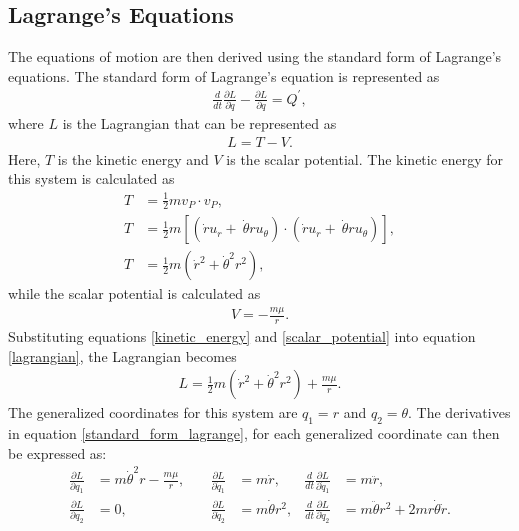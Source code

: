 \documentclass[]{article}
\begin{document}
\subsection{Lagrange's Equations}
The equations of motion are then derived using the standard form of Lagrange's equations. The standard form of Lagrange's equation is represented as
\begin{align}
	\frac{d}{dt}\frac{\partial L}{\partial \dot{q}} - \frac{\partial L}{\partial q} = Q^{'}, \label{standard_form_lagrange}
\end{align}
where \(L\) is the Lagrangian that can be represented as
\begin{align}
	L = T - V. \label{lagrangian}
\end{align}
Here, \(T\) is the kinetic energy and \(V\) is the scalar potential. The kinetic energy for this system is calculated as 
\begin{align}
	T &= \frac{1}{2}mv_{P} \cdot v_{P}, \nonumber\\
	T &= \frac{1}{2}m[(\dot{r}u_{r} +\ \dot{\theta}ru_{\theta}) \cdot (\dot{r}u_{r} +\ \dot{\theta}ru_{\theta})], \nonumber\\
	T &= \frac{1}{2}m(\dot{r}^2+\dot{\theta}^2r^2), \label{kinetic_energy}
\end{align}
while the scalar potential is calculated as
\begin{align}
	V = -\frac{m\mu}{r}. \label{scalar_potential}
\end{align}
Substituting equations \ref{kinetic_energy} and \ref{scalar_potential} into equation \ref{lagrangian}, the Lagrangian becomes
\begin{align}
	L = \frac{1}{2}m(\dot{r}^2+\dot{\theta}^2r^2) + \frac{m\mu}{r}. \label{lagrangian2}
\end{align}
 The generalized coordinates for this system are \(q_1 = r\) and \(q_2 = \theta\). The derivatives in equation \ref{standard_form_lagrange}, for each generalized coordinate can then be expressed as:
\begin{align*}
  \frac{\partial L}{\partial q_{1}} &= m\dot{\theta}^2r - \frac{m\mu}{r},\quad & \frac{\partial L}{\partial \dot{q}_{1}} &= m\dot{r},          & \frac{d}{dt}\frac{\partial L}{\partial \dot{q}_{1}} &= m\ddot{r}, \\
  \frac{\partial L}{\partial q_{2}} &= 0,\quad                                 & \frac{\partial L}{\partial \dot{q}_{2}} &= m\dot{\theta}r^2,  & \frac{d}{dt}\frac{\partial L}{\partial \dot{q}_{2}} &= m\ddot{\theta}r^2 + 2mr\dot{\theta}\dot{r}.
\end{align*}
\end{document}
